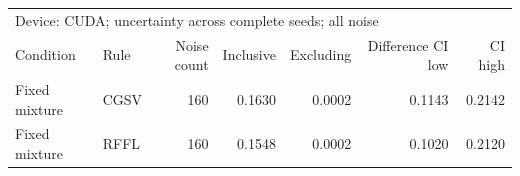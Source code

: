 \begin{tabular}{llrrrrr}
\toprule
\multicolumn{7}{l}{Device: CUDA; uncertainty across complete seeds; all noise} \\
Condition & Rule & Noise count & Inclusive & Excluding & Difference CI low & CI high \\
\midrule
Fixed mixture & CGSV & 160 & 0.1630 & 0.0002 & 0.1143 & 0.2142 \\
Fixed mixture & RFFL & 160 & 0.1548 & 0.0002 & 0.1020 & 0.2120 \\
\bottomrule
\end{tabular}
